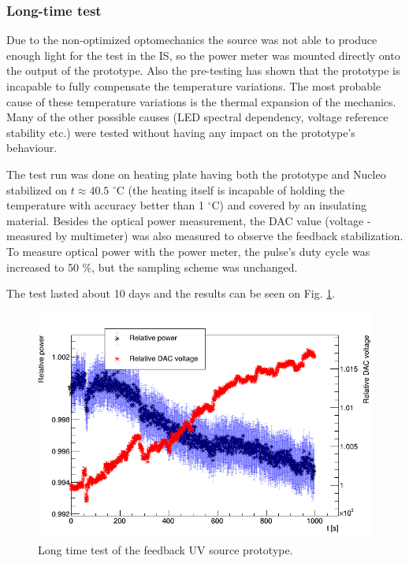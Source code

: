 \subsubsection{Long-time test}

Due to the non-optimized optomechanics the source was not able to produce enough light for the test in the IS, so the power meter was mounted directly onto the output of the prototype. Also the pre-testing has shown that the prototype is incapable to fully compensate the temperature variations. The most probable cause of these temperature variations is the thermal expansion of the mechanics. Many of the other possible causes (LED spectral dependency, voltage reference stability etc.) were tested without having any impact on the prototype's behaviour. 


\par
The test run was done on heating plate having both the prototype and Nucleo stabilized on $t \approx 40.5$ $^\circ $C (the heating itself is incapable of holding the temperature with accuracy better than 1 $^\circ $C) and covered by an insulating material. Besides the optical power measurement, the DAC value (voltage - measured by multimeter) was also measured to observe the feedback stabilization. To measure optical power with the power meter, the pulse's duty cycle was increased to 50 $\%$, but the sampling scheme was unchanged.

\par

The test lasted about 10 days and the results can be seen on Fig. \ref{Long test}.


\begin{figure}[H]
 \centering
 \includegraphics[scale=0.5]{./pictures/LongTime.png}
 \caption{Long time test of the feedback UV source prototype.}
 \label{Long test}
\end{figure}

